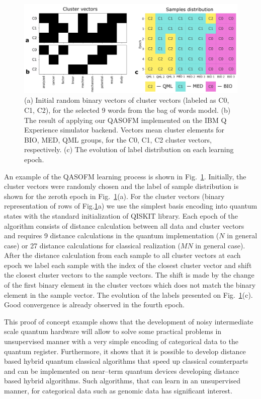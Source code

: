 \documentclass[pra,showkeys,twocolumn,showpacs,aps,10pt]{revtex4-1}
\begin{document}
\begin{figure}[t]
  \includegraphics[width=1.85\columnwidth]{convergence.png}
  \caption{
    (a) Initial random binary vectors of cluster vectors (labeled as C0, C1, C2),
    for the selected 9 words from the bag of words model.
    (b) The result of applying our QASOFM implemented on the IBM Q Experience simulator backend.
    Vectors mean cluster elements for BIO, MED, QML groups,
    for the C0, C1, C2 cluster vectors, respectively.
    (c) The evolution of label distribution on each learning epoch.
  }
  \label{convergence}
\end{figure}


An example of the QASOFM learning process is shown in Fig.~\ref{convergence}.
Initially, the cluster vectors were randomly chosen and the label of sample distribution is shown for the zeroth epoch in Fig.~\ref{convergence}(a). For the cluster  vectors (binary representation of rows of Fig.\ref{convergence}a) we use the simplest basis encoding into quantum  states with the standard initialization of QISKIT\cite{rathQuantumDataEncoding2024,qiskit} library.
Each epoch of the algorithm consists of distance calculation between all data and cluster vectors
and requires 9 distance calculations in the  quantum implementation ($N$ in general case)
or 27 distance calculations for classical realization
($MN$ in general case).
After the distance calculation from each sample to all cluster vectors at each epoch we label each sample with the index of the closest cluster vector
and shift the closest cluster vectors to the sample vectors.
The shift is made by the change of the first binary element in the cluster vectors which does not match the binary element in the sample vector.
The evolution of the labels presented on Fig.~\ref{convergence}(c).
Good convergence is already observed in the fourth epoch.

This proof of concept example shows that the development of noisy intermediate scale quantum hardware will allow to solve some practical problems in unsupervised manner with a very simple encoding of categorical data to the quantum register.
Furthermore, it shows that it is possible to develop distance based hybrid quantum classical algorithms
that speed up classical counterparts and can be implemented on near--term quantum devices
developing distance based hybrid algorithms. Such algorithms,
that can learn in an unsupervised manner, for categorical data such as genomic data has significant interest.
\end{document}
